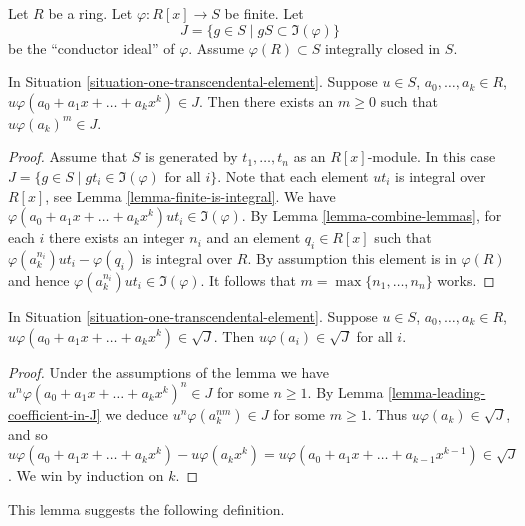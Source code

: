 \begin{situation}
\label{situation-one-transcendental-element}
Let $R$ be a ring.
Let $\varphi : R[x] \to S$ be finite.
Let
$$
J = \{ g \in S \mid gS \subset \Im(\varphi)\}
$$
be the ``conductor ideal'' of $\varphi$.
Assume $\varphi(R) \subset S$ integrally closed in $S$.
\end{situation}

\begin{lemma}
\label{lemma-leading-coefficient-in-J}
In Situation \ref{situation-one-transcendental-element}.
Suppose $u \in S$, $a_0, \ldots, a_k \in R$,
$u \varphi(a_0 + a_1x + \ldots + a_k x^k) \in J$.
Then there exists an $m \geq 0$ such that
$u \varphi(a_k)^m \in J$.
\end{lemma}

\begin{proof}
Assume that $S$ is generated by $t_1, \ldots, t_n$
as an $R[x]$-module. In this case
$J = \{ g \in S \mid gt_i \in \Im(\varphi)\text{ for all }i\}$.
Note that each element $u t_i$ is integral over
$R[x]$, see Lemma \ref{lemma-finite-is-integral}.
We have $\varphi(a_0 + a_1x + \ldots + a_k x^k) u t_i \in
\Im(\varphi)$. By Lemma \ref{lemma-combine-lemmas}, for
each $i$ there exists an integer $n_i$ and an element
$q_i \in R[x]$ such that $\varphi(a_k^{n_i}) u t_i - \varphi(q_i)$
is integral over $R$. By assumption this element is in $\varphi(R)$
and hence $\varphi(a_k^{n_i}) u t_i \in \Im(\varphi)$.
It follows that $m = \max\{n_1, \ldots, n_n\}$ works.
\end{proof}

\begin{lemma}
\label{lemma-all-coefficients-in-J}
In Situation \ref{situation-one-transcendental-element}.
Suppose $u \in S$, $a_0, \ldots, a_k \in R$,
$u \varphi(a_0 + a_1x + \ldots + a_k x^k) \in \sqrt{J}$.
Then $u \varphi(a_i) \in \sqrt{J}$ for all $i$.
\end{lemma}

\begin{proof}
Under the assumptions of the lemma we have
$u^n \varphi(a_0 + a_1x + \ldots + a_k x^k)^n \in J$ for
some $n \geq 1$. By Lemma \ref{lemma-leading-coefficient-in-J}
we deduce $u^n \varphi(a_k^{nm}) \in J$ for some $m \geq 1$.
Thus $u \varphi(a_k) \in \sqrt{J}$, and so
$u \varphi(a_0 + a_1x + \ldots + a_k x^k) - u \varphi(a_k x^k) =
u \varphi(a_0 + a_1x + \ldots + a_{k-1} x^{k-1}) \in \sqrt{J}$.
We win by induction on $k$.
\end{proof}

\noindent
This lemma suggests the following definition.

